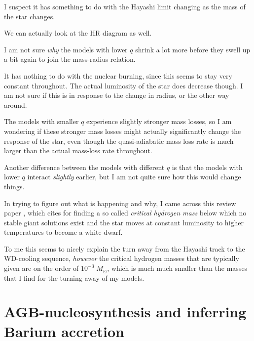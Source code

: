 \documentclass[a4paper,10pt]{article}
\begin{document}
I suspect it has something to do with the Hayashi limit changing as the mass of the star changes.

We can actually look at the HR diagram as well.

\begin{figure}[ht]
    \centering
\end{figure}

I am not sure \emph{why} the models with lower \(q\) shrink a lot more before they swell up a bit again to join the mass-radius relation.

It has nothing to do with the nuclear burning, since this seems to stay very constant throughout. The actual luminosity of the star does decrease though. I am not sure if this is in response to the change in radius, or the other way around.

The models with smaller \(q\) experience slightly stronger mass losses, so I am wondering if these stronger mass losses might actually significantly change the response of the star, even though the quasi-adiabatic mass loss rate is much larger than the actual mass-loss rate throughout.

Another difference between the models with different \(q\) is that the models with lower \(q\) interact \emph{slightly} earlier, but I am not quite sure how this would change things.

In trying to figure out what is happening and why, I came across this review paper \citep{kwok2024}, which cites \citet{paczynski1971} for finding a so called \emph{critical hydrogen mass} below which no stable giant solutions exist and the star moves at constant luminosity to higher temperatures to become a white dwarf.

To me this seems to nicely explain the turn away from the Hayashi track to the WD-cooling sequence, \emph{however} the critical hydrogen masses that are typically given are on the order of \(10^{-3}\; M_\odot \), which is much much smaller than the masses that I find for the turning away of my models.

\section{AGB-nucleosynthesis and inferring Barium accretion}
\end{document}
